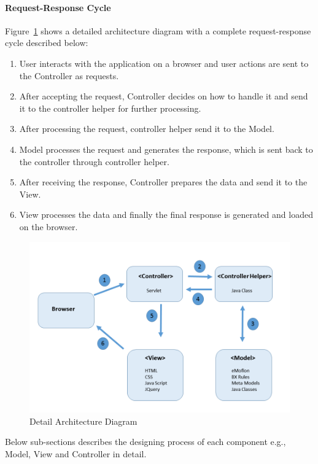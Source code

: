 \paragraph{Request-Response Cycle} 
Figure~\ref{fig:Detail_Architecture_Diagram} shows a detailed architecture diagram with a complete request-response cycle described below:
\begin{enumerate}
	\item {User interacts with the application on a browser and user actions are sent to the Controller as requests.}
	\item {After accepting the request, Controller decides on how to handle it and send it to the controller helper for further processing.}
	\item {After processing the request, controller helper send it to the Model.}
	\item {Model processes the request and generates the response, which is sent back to the controller through controller helper.}
	\item {After receiving the response, Controller prepares the data and send it to the View.}
	\item {View processes the data and finally the final response is generated and loaded on the browser.}
\end{enumerate}

\begin{figure}
	\includegraphics[width=1\textwidth]{figures/Detail_Arch}
	\caption{Detail Architecture Diagram}
	\label{fig:Detail_Architecture_Diagram}
\end{figure}

Below sub-sections describes the designing process of each component e.g., Model, View and Controller in detail.


